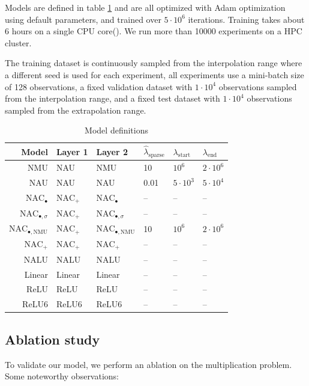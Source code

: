 Models are defined in table \ref{tab:simple-function-task-model-defintions} and are all optimized with Adam optimization \cite{adam-optimization} using default parameters, and trained over $5 \cdot 10^6$ iterations. Training takes about 6 hours on a single CPU core(). We run more than 10000 experiments on a HPC cluster.

The training dataset is continuously sampled from the interpolation range where a different seed is used for each experiment, all experiments use a mini-batch size of 128 observations, a fixed validation dataset with $1 \cdot 10^4$ observations sampled from the interpolation range, and a fixed test dataset with $1 \cdot 10^4$ observations sampled from the extrapolation range.

\begin{table}[h]
\caption{Model definitions}
\label{tab:simple-function-task-model-defintions}
\centering
\begin{tabular}{r l l l l l}
\toprule
 Model & Layer 1 & Layer 2 & $\hat{\lambda}_{\mathrm{sparse}}$ & $\lambda_{\mathrm{start}}$ & $\lambda_{\mathrm{end}}$ \\
 \midrule
 NMU & NAU & NMU & 10 & $10^6$ & $2 \cdot 10^6$ \\
 NAU & NAU & NAU & 0.01 & $5 \cdot 10^3$ & $5 \cdot 10^4$ \\
 $\mathrm{NAC}_{\bullet}$ & $\mathrm{NAC}_{+}$ & $\mathrm{NAC}_{\bullet}$ & -- & -- & -- \\
 $\mathrm{NAC}_{\bullet,\sigma}$ & $\mathrm{NAC}_{+}$ & $\mathrm{NAC}_{\bullet,\sigma}$ & -- & -- & -- \\
 $\mathrm{NAC}_{\bullet,\mathrm{NMU}}$ & $\mathrm{NAC}_{+}$ & $\mathrm{NAC}_{\bullet,\mathrm{NMU}}$ & 10 & $10^6$ & $2 \cdot 10^6$ \\
 $\mathrm{NAC}_{+}$ & $\mathrm{NAC}_{+}$ & $\mathrm{NAC}_{+}$ & -- & -- & -- \\
 NALU & NALU & NALU & -- & -- & -- \\
 Linear & Linear & Linear & -- & -- & -- \\
 ReLU & ReLU & ReLU & -- & -- & -- \\
 ReLU6 & ReLU6 & ReLU6 & -- & -- & -- \\
 \bottomrule
\end{tabular}
\end{table}

\subsection{Ablation study}
\label{sec:appendix:ablation-study}
To validate our model, we perform an ablation on the multiplication problem. Some noteworthy observations:

